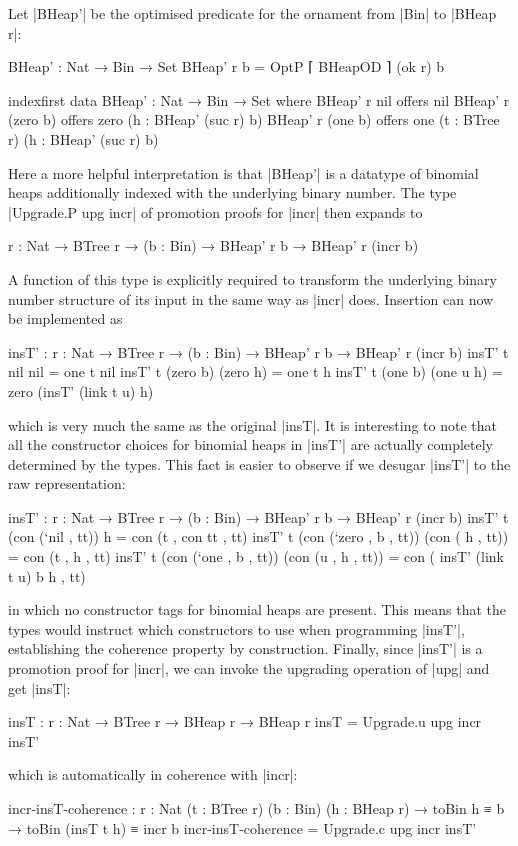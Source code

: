 Let |BHeap'| be the optimised predicate for the ornament from |Bin| to |BHeap r|:
\begin{code}
BHeap' : Nat → Bin → Set
BHeap' r b = OptP ⌈ BHeapOD ⌉ (ok r) b

indexfirst data BHeap' : Nat → Bin → Set where
  BHeap' r nil        offers  nil
  BHeap' r (zero  b)  offers  zero  (h : BHeap' (suc r) b)
  BHeap' r (one   b)  offers  one   (t : BTree r) (h : BHeap' (suc r) b)
\end{code}
Here a more helpful interpretation is that |BHeap'| is a datatype of binomial heaps additionally indexed with the underlying binary number.
The type |Upgrade.P upg incr| of promotion proofs for |incr| then expands to
\begin{code}
{r : Nat} → BTree r → (b : Bin) → BHeap' r b → BHeap' r (incr b)
\end{code}
A function of this type is explicitly required to transform the underlying binary number structure of its input in the same way as |incr| does.
Insertion can now be implemented as
\begin{code}
insT' : {r : Nat} → BTree r → (b : Bin) → BHeap' r b → BHeap' r (incr b)
insT' t nil        nil         = one t nil
insT' t (zero  b)  (zero   h)  = one t h
insT' t (one   b)  (one u  h)  = zero (insT' (link t u) h)
\end{code}
which is very much the same as the original |insT|.
It is interesting to note that all the constructor choices for binomial heaps in |insT'| are actually completely determined by the types.
This fact is easier to observe if we desugar |insT'| to the raw representation:
\begin{code}
insT' : {r : Nat} → BTree r → (b : Bin) → BHeap' r b → BHeap' r (incr b)
insT' t (con (`nil   ,      tt))  h                    = con (t ,  con tt                , tt)
insT' t (con (`zero  , b ,  tt))  (con (     h , tt))  = con (t ,  h                     , tt)
insT' t (con (`one   , b ,  tt))  (con (u ,  h , tt))  = con (     insT' (link t u) b h  , tt)
\end{code}
in which no constructor tags for binomial heaps are present.
This means that the types would instruct which constructors to use when programming |insT'|, establishing the coherence property by construction.
Finally, since |insT'| is a promotion proof for |incr|, we can invoke the upgrading operation of |upg| and get |insT|:
\begin{code}
insT : {r : Nat} → BTree r → BHeap r → BHeap r
insT = Upgrade.u upg incr insT'
\end{code}
which is automatically in coherence with |incr|:
\begin{code}
incr-insT-coherence :  {r : Nat} (t : BTree r) (b : Bin) (h : BHeap r) →
                       toBin h ≡ b → toBin (insT t h) ≡ incr b
incr-insT-coherence = Upgrade.c upg incr insT'
\end{code}

